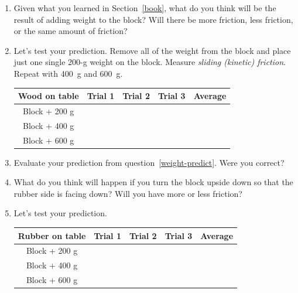 \documentclass[10pt]{exam}
\begin{document}
\begin{enumerate}
 
    
  \item \label{weight-predict}
    Given what you learned in Section~\ref{book}, what do you think will be the result of adding weight to the block? Will there be more friction, less friction, or the same amount of friction?
    \vs 
  
  \item 
    Let's test your prediction.  Remove all of the weight from the block and place just one single 200-g weight on the block.  Measure \emph{sliding (kinetic) friction}.  Repeat with 400~g and 600~g.

    \begin{tabular}{|c
      *3{|>{\centering\arraybackslash}m{.1\textwidth}}
      ||>{\centering\arraybackslash}m{.1\textwidth}|}
      \hline
        \bf Wood on table & Trial 1 &
                            Trial 2 & 
                            Trial 3 &  Average \\\hline
        Block + 200 g &&&& \\[1.5em]\hline
        Block + 400 g &&&& \\[1.5em]\hline
        Block + 600 g &&&& \\[1.5em]\hline
    \end{tabular}



  \item 
    Evaluate your prediction from question~\ref{weight-predict}.  Were you correct?
    \vs 


  \pagebreak

  \item \label{material-predict}
    What do you think will happen if you turn the block upside down so that the rubber side is facing down?  Will you have more or less friction?
    \vs 
  
  \item 
    Let's test your prediction.  

    \begin{tabular}{|c
      *3{|>{\centering\arraybackslash}m{.1\textwidth}}
      ||>{\centering\arraybackslash}m{.1\textwidth}|}
      \hline
        \bf Rubber on table & Trial 1 &
                              Trial 2 & 
                              Trial 3 &  Average \\\hline
        Block + 200 g &&&& \\[1.5em]\hline
        Block + 400 g &&&& \\[1.5em]\hline
        Block + 600 g &&&& \\[1.5em]\hline
    \end{tabular}


\end{enumerate}
\end{document}
